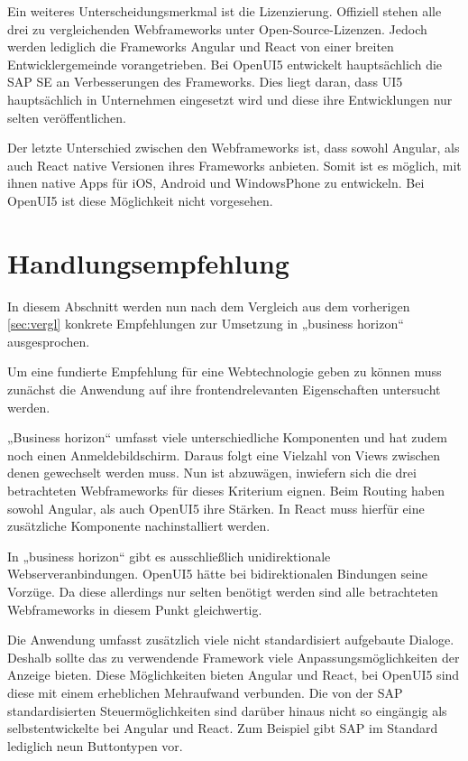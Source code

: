 Ein weiteres Unterscheidungsmerkmal ist die Lizenzierung. Offiziell stehen alle drei zu vergleichenden Webframeworks unter Open-Source-Lizenzen. Jedoch werden lediglich die Frameworks Angular und React von einer breiten Entwicklergemeinde vorangetrieben. Bei OpenUI5 entwickelt hauptsächlich die SAP SE an Verbesserungen des Frameworks. Dies liegt daran, dass UI5 hauptsächlich in Unternehmen eingesetzt wird und diese ihre Entwicklungen nur selten veröffentlichen. 

Der letzte Unterschied zwischen den Webframeworks ist, dass sowohl Angular, als auch React native Versionen ihres Frameworks anbieten. Somit ist es möglich, mit ihnen native Apps für iOS, Android und WindowsPhone zu entwickeln. Bei OpenUI5 ist diese Möglichkeit nicht vorgesehen.


\section{Handlungsempfehlung}\label{sec:empf}

In diesem Abschnitt werden nun nach dem Vergleich aus dem vorherigen \autoref{sec:vergl} konkrete Empfehlungen zur Umsetzung in „business horizon“ ausgesprochen.

Um eine fundierte Empfehlung für eine Webtechnologie geben zu können muss zunächst die Anwendung auf ihre frontendrelevanten Eigenschaften untersucht werden.



„Business horizon“ umfasst viele unterschiedliche Komponenten und hat zudem noch einen Anmeldebildschirm. Daraus folgt eine Vielzahl von Views zwischen denen gewechselt werden muss.
Nun ist abzuwägen, inwiefern sich die drei betrachteten Webframeworks für dieses Kriterium eignen. Beim Routing haben sowohl Angular, als auch OpenUI5 ihre Stärken. In React muss hierfür eine zusätzliche Komponente nachinstalliert werden.

In „business horizon“ gibt es ausschließlich unidirektionale Webserveranbindungen. OpenUI5 hätte bei bidirektionalen Bindungen seine Vorzüge. Da diese allerdings nur selten benötigt werden sind alle betrachteten Webframeworks in diesem Punkt gleichwertig.

Die Anwendung umfasst zusätzlich viele nicht standardisiert aufgebaute Dialoge. Deshalb sollte das zu verwendende Framework viele Anpassungsmöglichkeiten der Anzeige bieten. Diese Möglichkeiten bieten Angular und React, bei OpenUI5 sind diese mit einem erheblichen Mehraufwand verbunden. Die von der SAP standardisierten Steuermöglichkeiten sind darüber hinaus nicht so eingängig als selbstentwickelte bei Angular und React. Zum Beispiel gibt SAP im Standard lediglich neun Buttontypen vor\autocites[vgl.][]{UI5Doku1}.

